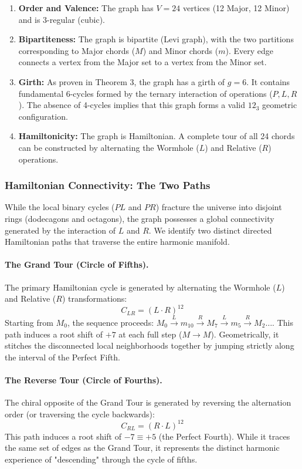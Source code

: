 \documentclass[12pt,letterpaper]{amsart}
\begin{document}
\begin{enumerate}
    \item \textbf{Order and Valence:} The graph has $V=24$ vertices (12 Major, 12 Minor) and is $3$-regular (cubic).
    
    \item \textbf{Bipartiteness:} The graph is bipartite (Levi graph), with the two partitions corresponding to Major chords ($M$) and Minor chords ($m$). Every edge connects a vertex from the Major set to a vertex from the Minor set.
    
    \item \textbf{Girth:} As proven in Theorem 3, the graph has a girth of $g=6$. It contains fundamental 6-cycles formed by the ternary interaction of operations ($P, L, R$). The absence of 4-cycles implies that this graph forms a valid $12_3$ geometric configuration.
    
    \item \textbf{Hamiltonicity:} The graph is Hamiltonian. A complete tour of all 24 chords can be constructed by alternating the Wormhole ($L$) and Relative ($R$) operations.
\end{enumerate}

\subsubsection{Hamiltonian Connectivity: The Two Paths}
While the local binary cycles ($PL$ and $PR$) fracture the universe into disjoint rings (dodecagons and octagons), the graph possesses a global connectivity generated by the interaction of $L$ and $R$. We identify two distinct directed Hamiltonian paths that traverse the entire harmonic manifold.

\paragraph{The Grand Tour (Circle of Fifths).}
The primary Hamiltonian cycle is generated by alternating the Wormhole ($L$) and Relative ($R$) transformations:
\[ C_{LR} = (L \cdot R)^{12} \]
Starting from $M_0$, the sequence proceeds: $M_0 \xrightarrow{L} m_{10} \xrightarrow{R} M_7 \xrightarrow{L} m_5 \xrightarrow{R} M_2 \dots$.
This path induces a root shift of $+7$ at each full step ($M \to M$). Geometrically, it stitches the disconnected local neighborhoods together by jumping strictly along the interval of the Perfect Fifth.

\paragraph{The Reverse Tour (Circle of Fourths).}
The chiral opposite of the Grand Tour is generated by reversing the alternation order (or traversing the cycle backwards):
\[ C_{RL} = (R \cdot L)^{12} \]
This path induces a root shift of $-7 \equiv +5$ (the Perfect Fourth). While it traces the same set of edges as the Grand Tour, it represents the distinct harmonic experience of "descending" through the cycle of fifths.
\end{document}
